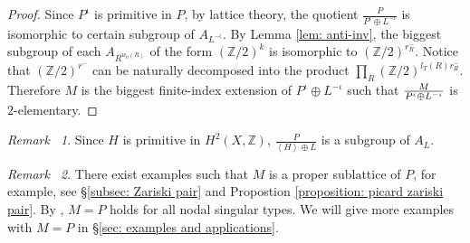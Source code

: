 \documentclass[12pt,reqno,a4paper]{amsart}
\newtheorem{thm}{Theorem~}[section]
\theoremstyle{remark}
\newtheorem{rmk}[thm]{Remark~}
\theoremstyle{definition}
\newcommand{\ZZ}{\mathbb{Z}}
\newcommand{\red}{\textcolor{red}}
\begin{document}
\begin{proof}
    Since $P^{\iota}$ is primitive in $P$, by lattice theory, the quotient $\frac{P}{P^{\iota}\oplus L^{-\iota}}$ is isomorphic to certain subgroup of $A_{L^{-\iota}}$. 
    By Lemma \ref{lem: anti-inv}, the biggest subgroup of each $A_{R^{w_0(R)}}$ of the form $(\ZZ/2)^k$ is isomorphic to $(\ZZ/2)^{r_R^-}$.
    Notice that $(\ZZ/2)^{r^-}$ can be naturally decomposed into the product $\prod\limits_{R}(\ZZ/2)^{l_T(R)r_R^-}$.
    Therefore $M$ is the biggest finite-index extension of $P^{\iota}\oplus L^{-\iota}$ such that $M\over{P^{\iota}\oplus L^{-\iota}}$ is $2$-elementary.
\end{proof}

\begin{rmk}
   Since $H$ is primitive in $H^2(X,\ZZ)$, $\frac{P}{\left\langle H \right\rangle \oplus L}$ is a subgroup of $A_L$. 
\end{rmk}

\begin{rmk}
    There exist examples such that $M$ is a proper sublattice of $P$, for example, see \S \ref{subsec: Zariski pair} and Propostion \ref{proposition: picard zariski pair}.
    By \cite[Proposition 3.4]{yu2023moduli}, $M=P$ holds for all nodal singular types.
    We will give more examples with $M=P$ in \S \ref{sec: examples and applications}.
\end{rmk}





\end{document}

